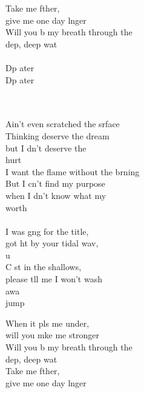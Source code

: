 \begin{cancion}
\begin{chorus}
	Take me fther, \\
	give me one day lnger\\
	Will you b my breath through the \\
	dep, deep wat\\
	\jump\\
	Dp ater    \\
	Dp ater    \\
	\end{chorus}%
	\jump\\
	\jump\\
	Ain't even scratched the srface\\
	Thinking  deserve the dream \\
	but I dn't deserve the \\
	hurt\\
	I want the flame without the brning\\
	But I cn't find my purpose \\
	when I dn't know what my \\
	worth \\
	\jump\\
	I was gng for the title, \\
	got ht by your tidal wav, \\
	u\\
	C st in the shallows, \\
	please tll me I won't wash\\
	 awa  \\jump\\
	\begin{chorus}%
	When it pls me under, \\
	will you mke me stronger\\
	Will you b my breath through the \\
	dep, deep wat\\
	Take me fther, \\
	give me one day lnger\\

\end{chorus}
\end{cancion}
